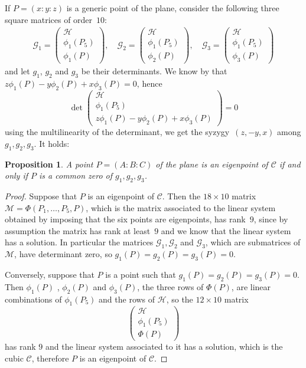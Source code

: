 \documentclass[11pt, a4paper, reqno, captions=tableheading,bibliography=totoc]{scrartcl}
\theoremstyle{plain}
\newtheorem{prop}[lemma]{Proposition}
\theoremstyle{definition}
\begin{document}
If $P = (x: y: z)$ is a generic point of the plane,
consider the following three square matrices of order~$10$:
%
\begin{eqnarray}
\label{G1G2G3}
\mathcal{G}_1 =
\left(
\begin{array}{c}
  \mathcal{H} \\
  \phi_1(P_5)\\
  \phi_1(P)
\end{array}
\right),
\quad
\mathcal{G}_2 =
\left(
\begin{array}{c}
  \mathcal{H} \\
  \phi_1(P_5)\\
  \phi_2(P)
\end{array}
\right),
\quad
\mathcal{G}_3 =
\left(
\begin{array}{c}
  \mathcal{H} \\
  \phi_1(P_5)\\
  \phi_3(P)
\end{array}
\right)
\end{eqnarray}
and let $g_1$, $g_2$ and $g_3$ be their determinants.
We know by  that $z \phi_1(P)-y\phi_2(P) +x\phi_3(P) = 0$, hence
%
\[
\det
\left(
\begin{array}{c}
  \mathcal{H} \\
  \phi_1(P_5)\\
  z \phi_1(P)-y\phi_2(P) +x\phi_3(P)
\end{array}
\right) = 0
\]
%
using the multilinearity of the determinant, we get the syzygy~$(z,-y,x)$ among
$g_1, g_2, g_3$.
It holds:
\begin{prop}
 \label{threeG}
  A point $P = (A: B: C)$ of the plane is an eigenpoint of $\mathcal{C}$ if and only if
  $P$ is a common zero of $g_1, g_2, g_3$.
\end{prop}
\begin{proof}
  Suppose that $P$ is an eigenpoint of $\mathcal{C}$. Then the $18\times 10$ matrix
  $\mathcal{M} = \Phi(P_1, \dots, P_5, P)$, which is the matrix
  associated to the linear
  system obtained by imposing that the six points are eigenpoints,
  has rank~$9$, since by assumption the matrix has rank at least~$9$ and we know that the linear system has a solution.
  In particular the matrices
  $\mathcal{G}_1, \mathcal{G}_2$ and $\mathcal{G}_3$, which are
  submatrices of $\mathcal{M}$, have determinant zero, so
  $g_1(P) = g_2(P) = g_3(P) = 0$.

  Conversely, suppose that $P$ is a point such that
  $g_1(P) = g_2(P) = g_3(P) = 0$. Then $\phi_1(P)$ , $\phi_2(P)$ and
  $\phi_3(P)$, the three rows of $\Phi(P)$, are linear combinations of
$\phi_1(P_5)$ and the rows of $\mathcal{H}$, so the $12\times 10$ matrix
  \[
\left(
\begin{array}{c}
  \mathcal{H} \\
  \phi_1(P_5)\\
  \Phi(P)
\end{array}
\right)
\]
%
has rank $9$ and the linear system associated to it has a solution,
which is the cubic $\mathcal{C}$, therefore $P$ is an eigenpoint of $\mathcal{C}$.
\end{proof}
\end{document}
